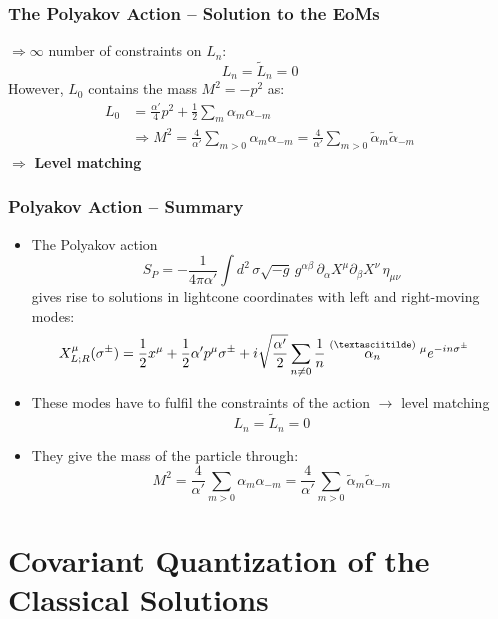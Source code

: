 \documentclass[aspectratio=169]{beamer}
\begin{document}
	\begin{frame}
		\frametitle{The Polyakov Action -- Solution to the EoMs}
		$\Rightarrow \infty$ number of constraints on $L_n$: 
		\begin{equation*}
			L_n = \tilde{L}_n = 0
		\end{equation*}
		However, $L_0$ contains the mass $M^2 = -p^2$ as:
		\begin{align*}
			L_0 &= \frac{\alpha'}{4}p^2 + \frac{1}{2} \sum_{m} \alpha_m \alpha_{-m} \\
			& \Rightarrow M^2 = \frac{4}{\alpha'} \sum_{m>0}\alpha_m\alpha_{-m} = \frac{4}{\alpha'} \sum_{m>0}\tilde{\alpha}_m\tilde{\alpha}_{-m}
		\end{align*}
		$\Rightarrow$ \textbf{Level matching}
	\end{frame}

	\begin{frame}
		\frametitle{Polyakov Action -- Summary}
		\begin{itemize}
			\item<1-> The Polyakov action
			\begin{equation*}
				S_P = -\frac{1}{4\pi\alpha'}\int d^2 \, \sigma \sqrt{-g} \, g^{\alpha\beta}\,\partial_\alpha X^\mu \partial_\beta X^\nu \, \eta_{\mu\nu}
			\end{equation*}
			gives rise to solutions in lightcone coordinates with left and right-moving modes:
			\begin{align*}
				X^\mu_{L;R}(\sigma^\pm) &= \frac{1}{2}x^\mu + \frac{1}{2} \alpha' p^\mu \sigma^\pm + i\sqrt{\frac{\alpha'}{2}} \sum_{n\neq 0} \frac{1}{n} \stackrel{(\textasciitilde)}{\alpha_n}{}^\mu e^{-in\sigma^\pm} 
			\end{align*}
			\item<2-> These modes have to fulfil the constraints of the action $\rightarrow$ level matching
			\begin{equation*}
				L_n = \tilde{L}_n = 0
			\end{equation*}
			\item<3-> They give the mass of the particle through:
			\begin{equation*}
				M^2 = \frac{4}{\alpha'} \sum_{m>0}\alpha_m\alpha_{-m} = \frac{4}{\alpha'} \sum_{m>0}\tilde{\alpha}_m\tilde{\alpha}_{-m}
			\end{equation*}
		\end{itemize}
	\end{frame}

	\section{Covariant Quantization of the  Classical Solutions}	
\end{document}
